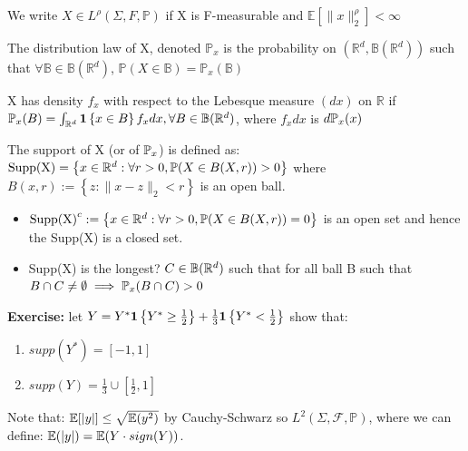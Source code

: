 \documentclass{article}
\begin{document}
\begin{definition}
    We write \(X \in L^{\rho}(\Sigma, F, \mathbb{P})\) if X is F-measurable and \(\mathbb{E}[\|x\|^{\rho}_{2}]< \infty\)
\end{definition}

\begin{definition}
The distribution law of X, denoted $\mathbb{P}_{x}$ is the probability on $(\mathbb{R}^{d}, \mathbb{B}(\mathbb{R}^{d}))$ such that \(\forall \mathbb{B} \in \mathbb{B}(\mathbb{R}^{d})\), \(\mathbb{P}(X \in \mathbb{B})= \mathbb{P}_{x}(\mathbb{B})\)
\end{definition}

\begin{definition}
    X has density \(f_{x}\) with respect to the Lebesque measure $(dx)$ on \(\mathbb{R}\) if \(\mathbb{P}_{x}(B)=\int_{\mathbb{R}^{d}} \mathbf{1} \left\{x \in B\right\} f_{x} dx , \forall B \in \mathbb{B}(\mathbb{R}^{d})\), where \(f_{x} dx\) is \(d\mathbb{P}_{x}(x)\)
\end{definition}

\begin{definition}
    The support of X (or of $\mathbb{P}_{x}$) is defined as: \(\text{Supp(X)}=\left\{x \in \mathbb{R}^{d} : \forall r>0, \mathbb{P}(X \in B(X,r))>0\right\}\) where \(B(x,r):=\left\{z:\|x-z\|_{2}<r\right\}\) is an open ball. 
\end{definition}

\begin{remark}
    \begin{itemize}
        \item \(\text{Supp(X)}^{c}:=\left\{x \in \mathbb{R}^{d} : \forall r>0, \mathbb{P}(X \in B(X,r))=0\right\}\) is an open set and hence the Supp(X) is a closed set. 
        \item Supp(X) is the longest? \(C \in \mathbb{B}(\mathbb{R}^{d})\) such that for all ball B such that \(B \cap C \neq \emptyset \implies \mathbb{P}_{x}(B \cap C )>0\)
    \end{itemize}
\end{remark}

\textbf{Exercise:} let \(Y= Y^{*} \mathbf{1} \left\{Y^{*} \geq \frac{1}{2}\right\}+ \frac{1}{3} \mathbf{1} \left\{Y^{*} < \frac{1}{2}\right\}\) show that: \begin{enumerate}
    \item \(supp(Y^*)=[-1,1] \)
    \item \(supp(Y)=\frac{1}{3} \cup [\frac{1}{2},1]\)
\end{enumerate}

\begin{remark}
    Note that: \(\mathbb{E}[|y|]\leq \sqrt{\mathbb{E}(y^{2})}\) by Cauchy-Schwarz so \(L^{2}(\Sigma, \mathcal{F}, \mathbb{P})\), where we can define: \(\mathbb{E}(|y|)=\mathbb{E}(Y \cdot sign(Y))\).
\end{remark}
\end{document}

